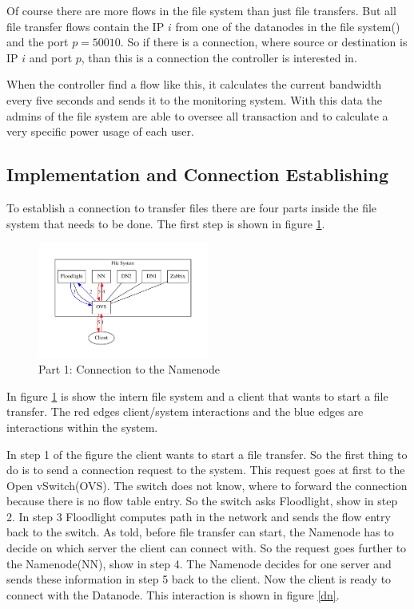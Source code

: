  Of course there are more flows in the file system than just file transfers. But all file transfer flows contain the IP $i$ from one of the datanodes in the file system() and the port $p=50010$. So if there is a connection, where source or destination is IP $i$ and port $p$, than this is a connection the controller is interested in.
 
 When the controller find a flow like this, it calculates the current bandwidth every five seconds and sends it to the monitoring system. With this data the admins of the file system are able to oversee all transaction and to calculate a very specific power usage of each user. 
 
 \subsection{Implementation and Connection Establishing}               

To establish a connection to transfer files there are four parts inside the file system that needs to be done. The first step is shown in figure \ref{nn}.
 
\begin{figure}[ht]
\centering
\includegraphics[width=0.5\textwidth]{img/connectionToNamenode} 
\caption{Part 1: Connection to the Namenode}
\label{nn}
\end{figure}

In figure \ref{nn} is show the intern file system and a client that wants to start a file transfer. The red edges client/system interactions and the blue edges are interactions within the system.

In step 1 of the figure the client wants to start a file transfer. So the first thing to do is to send a connection request to the system. This request goes at first to the Open vSwitch(OVS). The switch does not know, where to forward the connection because there is no flow table entry. So the switch asks Floodlight, show in step 2. In step 3 Floodlight computes path in the network and sends the flow entry back to the switch. As told, before file transfer can start, the Namenode has to decide on which server the client can connect with. So the request goes further to the Namenode(NN), show in step 4. The Namenode decides for one server and sends these information in step 5 back to the client. Now the client is ready to connect with the Datanode. This interaction is shown in figure \ref{dn}.

